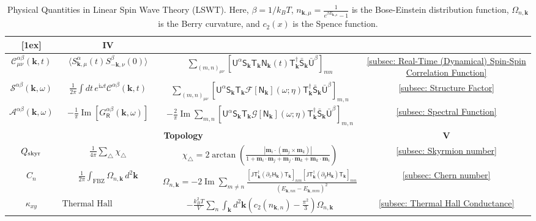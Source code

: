 \documentclass[aps, prx, nofootinbib, superscriptaddress]{revtex4-2}
\newcommand{\kvec}{\mathbf{k}}
\newcommand{\ri}{\mathrm{i}}
\begin{document}
\begin{table}[!h]
\begin{tabular}{c|c|c|c}
    [1ex]
    \hline
    \multicolumn{3}{c|}{\textbf{Correlations}} & \textbf{IV} \\[0.5ex]
    \hline
    $\mathcal{C}^{\alpha \beta}_{\mu\nu}(\kvec, t)$ 
    & 
    $\langle S_{\kvec,\mu}^\alpha(t) S_{-\kvec,\nu}^\beta(0) \rangle$ 
    & $\sum_{(m, n)_{\mu\nu}}
    [\mathsf{U}^\alpha \mathsf{S}_{\kvec} \mathsf{T}_{\kvec} \mathsf{N}_{\kvec}(t) \mathsf{T}_{\kvec}^\dagger \bar{\mathsf{S}}_{\kvec} \bar{\mathsf{U}}^{\beta}]_{m n}$ 
    & \ref{subsec: Real-Time (Dynamical) Spin-Spin Correlation Function} \\[1ex]
    $\mathcal{S}^{\alpha \beta}(\kvec,\omega)$ 
    & $\frac{1}{2 \pi} \int dt \, e^{\ri \omega t} \mathcal{C}^{\alpha \beta}(\kvec, t)$
    & $\sum_{(m, n)_{\mu\nu}} [ \mathsf{U}^\alpha \mathsf{S}_{\kvec} \mathsf{T}_{\kvec} \mathcal{F}[\mathsf{N}_{\kvec}](\omega; \eta) \mathsf{T}_{\kvec}^\dagger \bar{\mathsf{S}}_{\kvec} \bar{\mathsf{U}}^{\beta}]_{m, n}$ 
    & \ref{subsec: Structure Factor} \\[1ex]
    $\mathcal{A}^{\alpha \beta}(\kvec, \omega)$ 
    & $-\frac{1}{\pi} \operatorname{Im} [G_{\mathsf{R}}^{\alpha \beta}(\kvec, \omega)]$ & $-\frac{2}{\pi} \operatorname{Im} \sum_{m, n} [\mathsf{U}^\alpha \mathsf{S}_{\kvec} \mathsf{T}_{\kvec} \mathcal{G}[\mathsf{N}_{\kvec}] (\omega; \eta)
    \mathsf{T}_{\kvec}^\dagger \bar{\mathsf{S}}_{\kvec} \bar{\mathsf{U}}^\beta]_{m, n}$ & \ref{subsec: Spectral Function} \\
    \hline
    \multicolumn{3}{c|}{\textbf{Topology}} & \textbf{V} \\[0.5ex]
    \hline
    $Q_{\rm skyr}$ 
    & $\frac{1}{4\pi} \sum_{\triangle} \chi_{\triangle}$ 
    & $\chi_{\triangle} = 2 \arctan \left( \frac{|\mathbf{m}_i \cdot (\mathbf{m}_j \times \mathbf{m}_k)|}{1 + \mathbf{m}_i \cdot \mathbf{m}_j + \mathbf{m}_j \cdot \mathbf{m}_k + \mathbf{m}_k \cdot \mathbf{m}_i} \right)$
    & \ref{subsec: Skyrmion number}
    \\
    $C_n$ & $\frac{1}{2 \pi} \int_{\mathrm{FBZ}} \Omega_{n, \kvec} \, d^2 \kvec$ 
    & $\Omega_{n, \kvec} = -2 \operatorname{Im} \sum_{m \neq n} \frac{[\mathsf{J} \mathsf{T}_{\kvec}^\dagger (\partial_x \mathsf{H}_{\kvec}) \mathsf{T}_{\kvec}]_{nm} [\mathsf{J} \mathsf{T}_{\kvec}^\dagger (\partial_y \mathsf{H}_{\kvec}) \mathsf{T}_{\kvec}]_{mn}}{(E_{\kvec, nn} - E_{\kvec, mm})^2}$ 
    & \ref{subsec: Chern number} \\[1ex]
    $\kappa_{xy}$ 
    & $\text{Thermal Hall conductivity}$
    & $ - \frac{k_{B}^2 T}{V} \sum_{n} \int_{\kvec} d^{2} \kvec \left( c_2(n_{\kvec, n}) - \frac{\pi^2}{3} \right) \Omega_{n, \kvec}$ 
    &  \ref{subsec: Thermal Hall Conductance} \\
    \hline\hline
    \end{tabular}
    \caption{Physical Quantities in Linear Spin Wave Theory (LSWT). 
    Here, $\beta = 1/k_{B}T$,
    $n_{\kvec, \mu} = \frac{1}{e^{\beta E_{\kvec, \mu}} - 1}$ is the Bose-Einstein distribution function,
    $\Omega_{n, \kvec}$ is the Berry curvature, and 
    $c_2(x)$ is the Spence function.
    }
    \label{tab:lswt_quantities}
\end{table}
\end{document}
